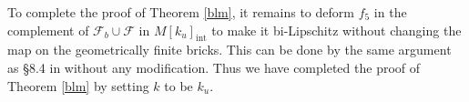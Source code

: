 \documentclass{amsart}
\newtheorem{lemma}[theorem]{Lemma}
\theoremstyle{definition}
\numberwithin{figure}{section}
\numberwithin{equation}{section}
\newcommand{\blackboard}[1]{\ensuremath{\mathbb{#1}}}
\newcommand{\reals}{\blackboard{R}}
\def\ck{\mathcal{K}}
\def\cv{\mathcal{V}}
\begin{document}
To complete the proof of Theorem \ref{blm}, it remains to deform $f_5$ in the complement of $\mathcal F_b \cup \mathcal F$ in $M[k_u]_\mathrm{int}$ to make it bi-Lipschitz without changing the map on the geometrically finite bricks.
This can be done by the same argument as \S8.4 in \cite{bcm} without any modification.
Thus we have completed the proof of Theorem \ref{blm} by setting $k$ to be $k_u$.



\end{document}

